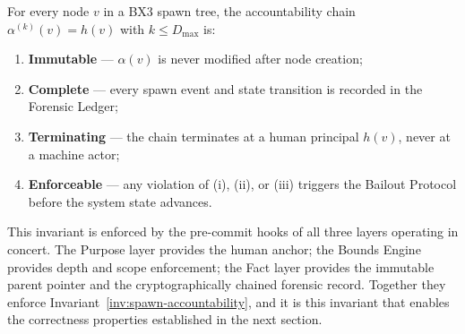 \begin{invariant}
\label{inv:spawn-accountability}
For every node $v$ in a BX3 spawn tree, the accountability chain
$\alpha^{(k)}(v) = h(v)$ with $k \leq D_{\max}$ is:
\begin{enumerate}
  \item[(i)] \textbf{Immutable} --- $\alpha(v)$ is never modified after node
    creation;
  \item[(ii)] \textbf{Complete} --- every spawn event and state transition is
    recorded in the Forensic Ledger;
  \item[(iii)] \textbf{Terminating} --- the chain terminates at a human
    principal $h(v)$, never at a machine actor;
  \item[(iv)] \textbf{Enforceable} --- any violation of (i), (ii), or (iii)
    triggers the Bailout Protocol before the system state advances.
\end{enumerate}
\end{invariant}

This invariant is enforced by the pre-commit hooks of all three layers operating
in concert.  The Purpose layer provides the human anchor; the Bounds Engine
provides depth and scope enforcement; the Fact layer provides the immutable
parent pointer and the cryptographically chained forensic record.  Together they
enforce Invariant~\ref{inv:spawn-accountability}, and it is this invariant that
enables the correctness properties established in the next section.
